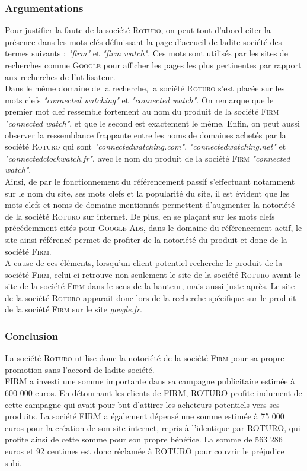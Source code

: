 \subsubsection{Argumentations}
Pour justifier la faute de la société \textsc{Roturo}, on peut tout d'abord citer la présence dans les mots clés définissant la page d'accueil de ladite société des termes suivants : \emph{"firm"} et \emph{"firm watch"}. Ces mots sont utilisés par les sites de recherches comme \textsc{Google} pour afficher les pages les plus pertinentes par rapport aux recherches de l'utilisateur.\\
Dans le même domaine de la recherche, la société \textsc{Roturo} s'est placée sur les mots clefs \emph{"connected watching"} et \emph{"connected watch"}. On remarque que le premier mot clef ressemble fortement au nom du produit de la société \textsc{Firm} \textit{"connected watch"}, et que le second est exactement le même.
Enfin, on peut aussi observer la ressemblance frappante entre les noms de domaines achetés par la société \textsc{Roturo} qui sont \emph{"connectedwatching.com"}, \emph{"connectedwatching.net"} et \emph{"connectedclockwatch.fr"}, avec le nom du produit de la société \textsc{Firm} \emph{"connected watch"}.\\
Ainsi, de par le fonctionnement du référencement passif s'effectuant notamment sur le nom du site, ses mots clefs et la popularité du site, il est évident que les mots clefs et noms de domaine mentionnés permettent d'augmenter la notoriété de la société \textsc{Roturo} sur internet. De plus, en se plaçant sur les mots clefs précédemment cités pour \textsc{Google Ads}, dans le domaine du référencement actif, le site ainsi référencé permet de profiter de la notoriété du produit et donc de la société \textsc{Firm}.\\
A cause de ces éléments, lorsqu'un client potentiel recherche le produit de la société \textsc{Firm}, celui-ci retrouve non seulement le site de la société \textsc{Roturo} avant le site de la société \textsc{Firm} dans le sens de la hauteur, mais aussi juste après. Le site de la société \textsc{Roturo} apparait donc lors de la recherche spécifique sur le produit de la société \textsc{Firm} sur le site \textit{google.fr}. \\
\subsubsection{Conclusion}
La société \textsc{Roturo} utilise donc la notoriété de la société \textsc{Firm} pour sa propre promotion sans l'accord de ladite société.\\
FIRM a investi une somme importante dans sa campagne publicitaire estimée à 600 000 euros. En détournant les clients de FIRM, ROTURO profite indument de cette campagne qui avait pour but d'attirer les acheteurs potentiels vers ses produits. La société FIRM a également dépensé une somme estimée à 75 000 euros pour la création de son site internet, repris à l'identique par ROTURO, qui profite ainsi de cette somme pour son propre bénéfice. La somme de 563 286 euros et 92 centimes est donc réclamée à ROTURO pour couvrir le préjudice subi.